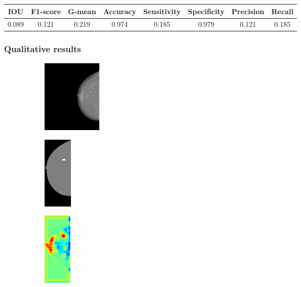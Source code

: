 \documentclass{beamer}
\begin{document}
\begin{frame}
		\scriptsize
		\begin{table}[h]
			\centering
			\begin{tabular}{cccccccc}
			\hline
			\textbf{IOU}	& \textbf{F1-score}	& \textbf{G-mean} &\textbf{Accuracy}	& \textbf{Sensitivity} & \textbf{Specificity} & \textbf{Precision} & \textbf{Recall}\\
			\hline
			0.089 & 0.121 & 0.219 & 0.974 & 0.185 & 0.979 & 0.121 & 0.185\\
			\hline
			\end{tabular}
		\end{table}
	\end{frame}
	
	\begin{frame}
		\frametitle{Qualitative results}
		\begin{figure}[h]
		\centering
			\begin{subfigure}{0.25\textwidth}
				\centering
					\includegraphics[height=3.5cm]{plots/mammogram_ex1.png}
			\end{subfigure}
			\begin{subfigure}{0.16\textwidth}
				\centering
					\includegraphics[height=3.5cm]{plots/label_ex1.png}
			\end{subfigure}
			\begin{subfigure}{0.17\textwidth}
				\centering
					\includegraphics[height=3.5cm]{plots/logits_ex1_v3.png}
			\end{subfigure}

\end{figure}
\end{frame}
\end{document}
